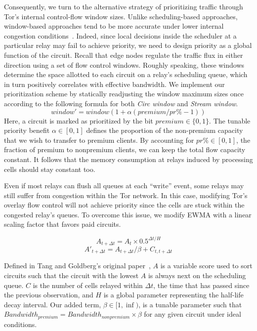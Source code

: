 Consequently, we turn to the alternative strategy of prioritizing traffic through Tor's internal control-flow window sizes.
Unlike scheduling-based approaches, window-based approaches tend to be more accurate under lower internal congestion conditions~\cite{archive-2009-mail, kiraly2008solving}.
Indeed, since local decisions inside the scheduler at a particular relay may fail to achieve priority, we need to design priority as a global function of the circuit.
Recall that edge nodes regulate the traffic flux in either direction using a set of flow control windows.
Roughly speaking, these windows determine the space allotted to each circuit on a relay's scheduling queue, which in turn positively correlates with effective bandwidth.
We implement our prioritization scheme by statically readjusting the window maximum sizes once according to the following formula for both \emph{Circ window} and \emph{Stream window}.
\begin{equation} window' = window(1+ \alpha(premium / pr\% - 1)) \label{eq:flow} \end{equation} Here, a circuit is marked as prioritized by the bit $premium \in \{0, 1\}$.
The tunable priority benefit $\alpha \in [0, 1]$ defines the proportion of the non-premium capacity that we wish to transfer to premium clients.
By accounting for $pr\% \in [0,1]$, the fraction of premium to nonpremium clients, we can keep the total flow capacity constant.
It follows that the memory consumption at relays induced by processing cells should stay constant too.

Even if most relays can flush all queues at each ``write'' event, some relays may still suffer from congestion within the Tor network.
In this case, modifying Tor's overlay flow control will not achieve priority since the cells are stuck within the congested relay's queues.
To overcome this issue, we modify EWMA with a linear scaling factor that favors paid circuits.

\begin{equation}
  A_{t + \Delta t} = A_t \times 0.5^{\Delta t/H}
\end{equation}
\begin{equation}
  A'_{t + \Delta t} = A_{t + \Delta t} / \beta + C_{t, t + \Delta t}
\end{equation}

Defined in Tang and Goldberg's original paper~\cite{tang2010improved}, $A$ is a variable score used to sort circuits such that the circuit with the lowest $A$ is always next on the scheduling queue.
$C$ is the number of cells relayed within $\Delta t$, the time that has passed since the previous observation, and $H$ is a global parameter representing the half-life decay interval.
Our added term, $\beta \in [1, \inf)$, is a tunable parameter such that $\mathit{Bandwidth}_{\mathit{premium}} = \mathit{Bandwidth}_{\mathit{nonpremium}} \times \beta$ for any given circuit under ideal conditions.

